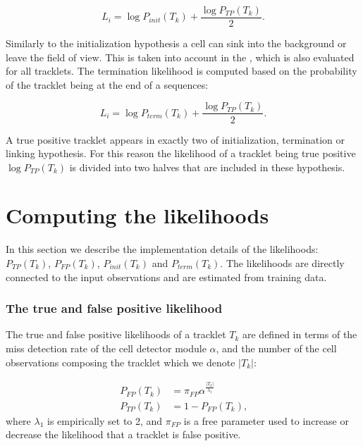 		\[
			L_i = \log P_{init}(T_k) + \frac{\log P_{TP}(T_k)}{2}\text{.}
		\]
		
			
		Similarly to the initialization hypothesis a cell can sink into the background or leave the field of view. This is taken into account in the , which is also evaluated for all tracklets. The termination likelihood is computed based on the probability of the tracklet being at the end of a sequences:
		
		\[
			L_i = \log P_{term}(T_k) + \frac{\log P_{TP}(T_k)}{2}\text{.}
		\]
		
		A true positive tracklet appears in exactly two of initialization, termination or linking hypothesis. For this reason the likelihood of a tracklet being true positive $\log P_{TP}(T_k)$ is divided into two halves that are included in these hypothesis.
       	
    \section{Computing the likelihoods \statusfirstdraft}
       	\label{sec:computinglikelihoods}
       	
       	In this section we describe the implementation details of the likelihoods: $P_{TP}(T_k)$, $P_{FP}(T_k)$, $P_{init}(T_k)$ and $P_{term}(T_k)$. The likelihoods are directly connected to the input observations and are estimated from training data.

       	\subsubsection{The true and false positive likelihood\statusfirstdraft}
       		
       		The true and false positive likelihoods of a tracklet $T_k$ are defined in terms of the miss detection rate of the cell detector module $\alpha$, and the number of the cell observations composing the tracklet which we denote $|T_k|$:
       		
       		\begin{align*}
	       		P_{FP}(T_k) &= \pi_{FP} \alpha^{\frac{|T_k|}{\lambda_1}} \\
	       		P_{TP}(T_k) &= 1 - P_{FP}(T_k) \text{,}
       		\end{align*}
			\noindent where $ \lambda_1 $ is empirically set to 2, and $\pi_{FP}$ is a free parameter used to increase or decrease the likelihood that a tracklet is false positive.
       		
